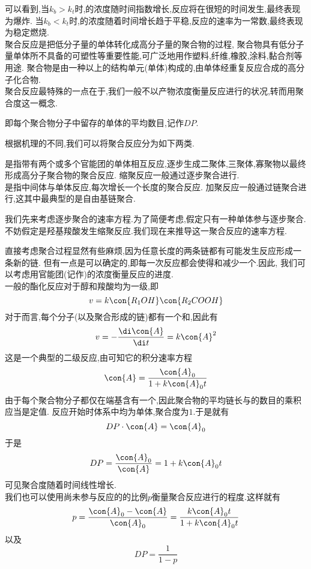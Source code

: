\documentclass{ctexart}
\begin{document}
\begin{figure}[H]
    \centering
\end{figure}
可以看到,当$k_b>k_t$时,的浓度随时间指数增长,反应将在很短的时间发生,最终表现为爆炸.%
当$k_b<k_t$时,的浓度随着时间增长趋于平稳,反应的速率为一常数,最终表现为稳定燃烧.\vspace{12pt}\\
\indent 聚合反应是把低分子量的单体转化成高分子量的聚合物的过程,%
聚合物具有低分子量单体所不具备的可塑性等重要性能,可广泛地用作塑料,纤维,橡胶,涂料,黏合剂等用途.%
聚合物是由一种以上的结构单元(单体)构成的,由单体经重复反应合成的高分子化合物.\\
\indent 聚合反应最特殊的一点在于,我们一般不以产物浓度衡量反应进行的状况,转而用聚合度这一概念.
\begin{definition}[7D.2.1 聚合度]
    即每个聚合物分子中留存的单体的平均数目,记作$DP$.
\end{definition}
根据机理的不同,我们可以将聚合反应分为如下两类.
\begin{definition}[7D.2.2 逐步聚合与链聚合]
    是指带有两个或多个官能团的单体相互反应,逐步生成二聚体,三聚体,寡聚物以最终形成高分子聚合物的聚合反应.%
    缩聚反应一般通过逐步聚合进行.\\
    是指中间体与单体反应,每次增长一个长度的聚合反应.%
    加聚反应一般通过链聚合进行,这其中最典型的是自由基链聚合.
\end{definition}
我们先来考虑逐步聚合的速率方程.为了简便考虑,假定只有一种单体参与逐步聚合.%
不妨假定是羟基羧酸发生缩聚反应.我们现在来推导这一聚合反应的速率方程.
\begin{derivation}
    直接考虑聚合过程显然有些麻烦,因为任意长度的两条链都有可能发生反应形成一条新的链.%
    但有一点是可以确定的,即每一次反应都会使得和减少一个.因此,%
    我们可以考虑用官能团(记作)的浓度衡量反应的进度.\\
    一般的酯化反应对于醇和羧酸均为一级,即
    \[v=k\con{R_1OH}\con{R_2COOH}\]
    对于而言,每个分子(以及聚合形成的链)都有一个和,因此有
    \[v=-\dfrac{\di\con{A}}{\di t}=k\con{A}^2\]
    这是一个典型的二级反应,由可知它的积分速率方程
    \[\con{A}=\dfrac{\con{A}_0}{1+k\con{A}_0t}\]
    由于每个聚合物分子都仅在端基含有一个,因此聚合物的平均链长与的数目的乘积应当是定值.%
    反应开始时体系中均为单体,聚合度为$1$.于是就有
    \[DP\cdot\con{A}=\con{A}_0\]
    于是
    \[DP=\dfrac{\con{A}_0}{\con{A}}=1+k\con{A}_0t\]
    可见聚合度随着时间线性增长.\\
    我们也可以使用尚未参与反应的的比例$p$衡量聚合反应进行的程度.这样就有
    \[p=\dfrac{\con{A}_0-\con{A}}{\con{A}_0}=\dfrac{k\con{A}_0t}{1+k\con{A}_0t}\]
    以及
    \[DP=\dfrac{1}{1-p}\]

\end{derivation}
\end{document}
